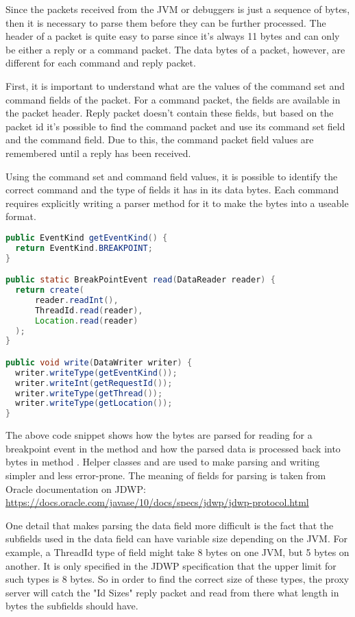 \documentclass[..thesis.tex]{subfiles}
\begin{document}
Since the packets received from the JVM or debuggers is just a sequence of bytes, then it is necessary to parse them before they can be further processed.
The header of a packet is quite easy to parse since it's always 11 bytes and can only be either a reply or a command packet.
The data bytes of a packet, however, are different for each command and reply packet.

First, it is important to understand what are the values of the command set and command fields of the packet. 
For a command packet, the fields are available in the packet header.
Reply packet doesn't contain these fields, but based on the packet id it's possible to find the command packet and use its command set field and the command field.
Due to this, the command packet field values are remembered until a reply has been received. 

Using the command set and command field values, it is possible to identify the correct command and the type of fields it has in its data bytes.
Each command requires explicitly writing a parser method for it to make the bytes into a useable format.

\begin{lstlisting}[language=java]
public EventKind getEventKind() {
  return EventKind.BREAKPOINT;
}

public static BreakPointEvent read(DataReader reader) {
  return create(
      reader.readInt(),
      ThreadId.read(reader),
      Location.read(reader)
  );
}

public void write(DataWriter writer) {
  writer.writeType(getEventKind());
  writer.writeInt(getRequestId());
  writer.writeType(getThread());
  writer.writeType(getLocation());
}
\end{lstlisting}

The above code snippet shows how the bytes are parsed for reading for a breakpoint event in the method  and how the parsed data is processed back into bytes in method .
Helper classes  and  are used to make parsing and writing simpler and less error-prone.
The meaning of fields for parsing is taken from Oracle documentation on JDWP: \url{https://docs.oracle.com/javase/10/docs/specs/jdwp/jdwp-protocol.html} 

One detail that makes parsing the data field more difficult is the fact that the subfields used in the data field can have variable size depending on the JVM.
For example, a ThreadId type of field might take 8 bytes on one JVM, but 5 bytes on another.
It is only specified in the JDWP specification that the upper limit for such types is 8 bytes.
So in order to find the correct size of these types, the proxy server will catch the "Id Sizes" reply packet and read from there what length in bytes the subfields should have.
\end{document}
